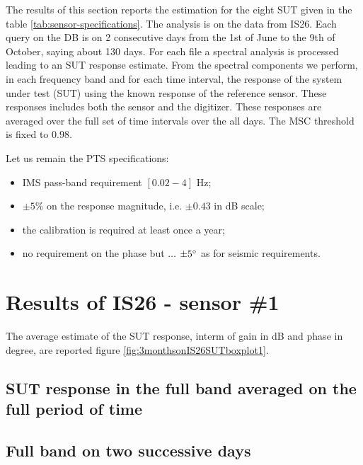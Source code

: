 The results of this section reports the estimation for the eight SUT given in the table \ref{tab:sensor-specifications}.
The analysis is on the data from IS26. Each query on the DB is on 2 consecutive days from the 1st of June to the 9th of October, saying about 130 days. For each file a spectral analysis is processed leading to an SUT response estimate. From the spectral components we perform, in each frequency band and for each time interval, the response of the system under test (SUT) using the known response of the reference sensor. These responses includes both the sensor and the digitizer. These responses are averaged over the full set of time intervals over the all days. The  MSC threshold is fixed to $0.98$. 

Let us remain the PTS specifications:
\begin{itemize}
\item
IMS pass-band requirement $[0.02 - 4]$ Hz;
 \item
$\pm 5\%$ on the response magnitude, i.e. $\pm 0.43$ in dB scale;
\item
the calibration is required at least once a year;
 \item
no requirement  on the phase but $\ldots$ $\pm 5^{\circ}$ as for seismic requirements.
\end{itemize}


 \newpage
\section{Results of IS26 - sensor \#1}
The average estimate of the SUT response, interm of gain in dB and phase in degree, are reported figure \ref{fig:3monthsonIS26SUTboxplot1}.
\subsection{SUT response in the full band averaged on the full period of time}
 

\newpage\clearpage
\subsection{Full band on two successive days}


